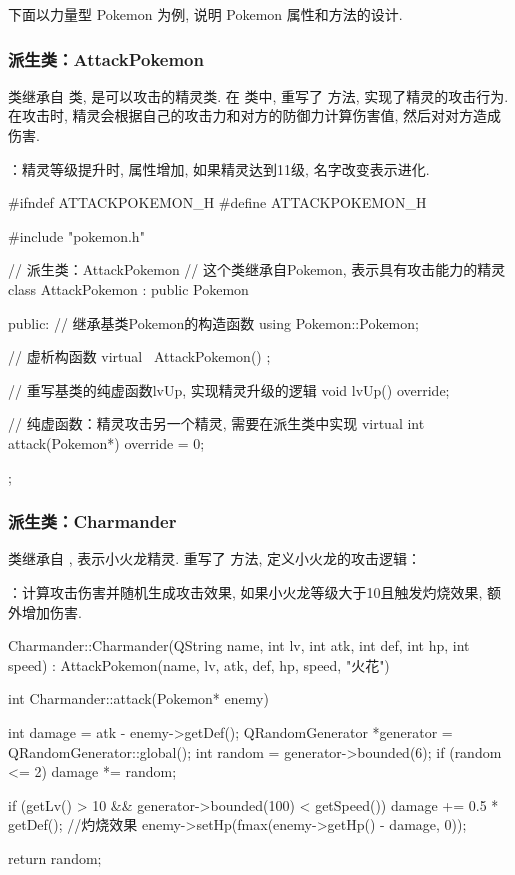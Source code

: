 下面以力量型 Pokemon 为例, 说明 Pokemon 属性和方法的设计.

\subsubsection{派生类：AttackPokemon}

 类继承自  类, 是可以攻击的精灵类. 在  类中, 重写了  方法, 实现了精灵的攻击行为. 在攻击时, 精灵会根据自己的攻击力和对方的防御力计算伤害值, 然后对对方造成伤害.

：精灵等级提升时, 属性增加, 如果精灵达到11级, 名字改变表示进化.

\begin{cppcode}
    #ifndef ATTACKPOKEMON_H
    #define ATTACKPOKEMON_H

    #include "pokemon.h"

    // 派生类：AttackPokemon
    // 这个类继承自Pokemon, 表示具有攻击能力的精灵
    class AttackPokemon : public Pokemon {
            public:
            // 继承基类Pokemon的构造函数
            using Pokemon::Pokemon;

            // 虚析构函数
            virtual ~AttackPokemon() {};

            // 重写基类的纯虚函数lvUp, 实现精灵升级的逻辑
            void lvUp() override;

            // 纯虚函数：精灵攻击另一个精灵, 需要在派生类中实现
            virtual int attack(Pokemon*) override = 0;
        };
\end{cppcode}

\subsubsection{派生类：Charmander}

 类继承自 , 表示小火龙精灵. 重写了  方法, 定义小火龙的攻击逻辑：

：计算攻击伤害并随机生成攻击效果, 如果小火龙等级大于10且触发灼烧效果, 额外增加伤害.

\begin{cppcode}
    Charmander::Charmander(QString name, int lv, int atk, int def, int hp, int speed) : AttackPokemon(name, lv, atk, def, hp, speed, "火花") {}

    int Charmander::attack(Pokemon* enemy) {
            int damage = atk - enemy->getDef();
            QRandomGenerator *generator = QRandomGenerator::global();
            int random = generator->bounded(6);
            if (random <= 2) {
                    damage *= random;
                }

            if (getLv() > 10 && generator->bounded(100) < getSpeed()) {
                    damage += 0.5 * getDef();
                } //灼烧效果
            enemy->setHp(fmax(enemy->getHp() - damage, 0));

            return random;
        }
\end{cppcode}

